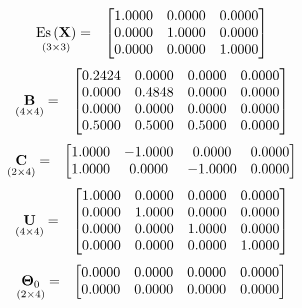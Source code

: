 \documentclass{glimmpse-report}
\begin{document}
\begin{eqnarray*}
\underset{\left(3\times3\right)}{\text{Es}\left(\mathbf{X}\right)} & = & \begin{bmatrix}1.0000 & 0.0000 & 0.0000\protect\\
0.0000 & 1.0000 & 0.0000\protect\\
0.0000 & 0.0000 & 1.0000\protect\\
\end{bmatrix}
\end{eqnarray*}
\begin{eqnarray*}
\underset{\left(4\times4\right)}{\mathbf{B}} & = & \begin{bmatrix}0.2424 & 0.0000 & 0.0000 & 0.0000\protect\\
0.0000 & 0.4848 & 0.0000 & 0.0000\protect\\
0.0000 & 0.0000 & 0.0000 & 0.0000\protect\\
0.5000 & 0.5000 & 0.5000 & 0.0000\protect\\
\end{bmatrix}
\end{eqnarray*}
\begin{eqnarray*}
\underset{\left(2\times4\right)}{\mathbf{C}} & = & \begin{bmatrix}1.0000 & -1.0000 & 0.0000 & 0.0000\protect\\
1.0000 & 0.0000 & -1.0000 & 0.0000\protect\\
\end{bmatrix}
\end{eqnarray*}
\begin{eqnarray*}
\underset{\left(4\times4\right)}{\mathbf{U}} & = & \begin{bmatrix}1.0000 & 0.0000 & 0.0000 & 0.0000\protect\\
0.0000 & 1.0000 & 0.0000 & 0.0000\protect\\
0.0000 & 0.0000 & 1.0000 & 0.0000\protect\\
0.0000 & 0.0000 & 0.0000 & 1.0000\protect\\
\end{bmatrix}
\end{eqnarray*}
\begin{eqnarray*}
\underset{\left(2\times4\right)}{\mathbf{\Theta}_0} & = & \begin{bmatrix}0.0000 & 0.0000 & 0.0000 & 0.0000\protect\\
0.0000 & 0.0000 & 0.0000 & 0.0000\protect\\
\end{bmatrix}
\end{eqnarray*}
\end{document}
